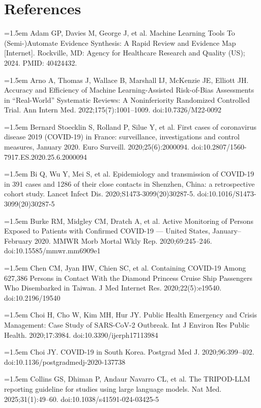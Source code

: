 \documentclass[11pt,a4paper]{article}
\newcommand{\referenceitem}[1]{\noindent\hangafter=1\hangindent=1.5em #1\par\medskip}
\begin{document}
\section*{References}

\referenceitem{Adam GP, Davies M, George J, et al. Machine Learning Tools To (Semi-)Automate Evidence Synthesis: A Rapid Review and Evidence Map [Internet]. Rockville, MD: Agency for Healthcare Research and Quality (US); 2024. PMID: 40424432.}

\referenceitem{Arno A, Thomas J, Wallace B, Marshall IJ, McKenzie JE, Elliott JH. Accuracy and Efficiency of Machine Learning-Assisted Risk-of-Bias Assessments in “Real-World” Systematic Reviews: A Noninferiority Randomized Controlled Trial. Ann Intern Med. 2022;175(7):1001–1009. doi:10.7326/M22-0092}

\referenceitem{Bernard Stoecklin S, Rolland P, Silue Y, et al. First cases of coronavirus disease 2019 (COVID-19) in France: surveillance, investigations and control measures, January 2020. Euro Surveill. 2020;25(6):2000094. doi:10.2807/1560-7917.ES.2020.25.6.2000094}

\referenceitem{Bi Q, Wu Y, Mei S, et al. Epidemiology and transmission of COVID-19 in 391 cases and 1286 of their close contacts in Shenzhen, China: a retrospective cohort study. Lancet Infect Dis. 2020;S1473-3099(20)30287-5. doi:10.1016/S1473-3099(20)30287-5}

\referenceitem{Burke RM, Midgley CM, Dratch A, et al. Active Monitoring of Persons Exposed to Patients with Confirmed COVID-19 — United States, January–February 2020. MMWR Morb Mortal Wkly Rep. 2020;69:245–246. doi:10.15585/mmwr.mm6909e1}

\referenceitem{Chen CM, Jyan HW, Chien SC, et al. Containing COVID-19 Among 627,386 Persons in Contact With the Diamond Princess Cruise Ship Passengers Who Disembarked in Taiwan. J Med Internet Res. 2020;22(5):e19540. doi:10.2196/19540}

\referenceitem{Choi H, Cho W, Kim MH, Hur JY. Public Health Emergency and Crisis Management: Case Study of SARS-CoV-2 Outbreak. Int J Environ Res Public Health. 2020;17:3984. doi:10.3390/ijerph17113984}

\referenceitem{Choi JY. COVID-19 in South Korea. Postgrad Med J. 2020;96:399–402. doi:10.1136/postgradmedj-2020-137738}

\referenceitem{Collins GS, Dhiman P, Andaur Navarro CL, et al. The TRIPOD-LLM reporting guideline for studies using large language models. Nat Med. 2025;31(1):49–60. doi:10.1038/s41591-024-03425-5}
\end{document}
